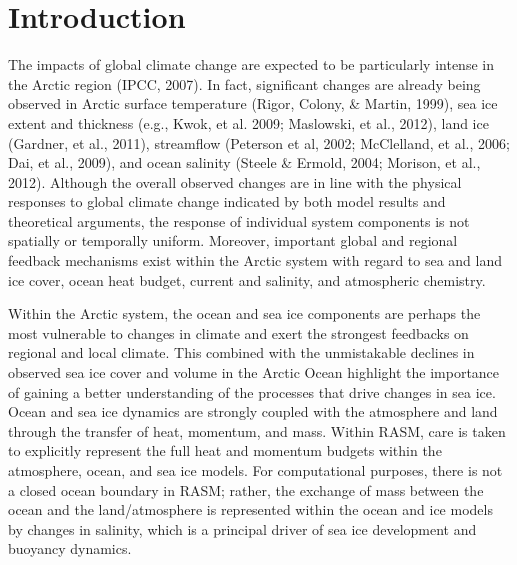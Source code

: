 \section{Introduction}
 
The impacts of global climate change are expected to be particularly intense in the Arctic region (IPCC, 2007).
In fact, significant changes are already being observed in Arctic surface temperature (Rigor, Colony, & Martin, 1999), sea ice extent and thickness (e.g., Kwok, et al. 2009; Maslowski, et al., 2012), land ice (Gardner, et al., 2011), streamflow (Peterson et al, 2002; McClelland, et al., 2006; Dai, et al., 2009), and ocean salinity (Steele & Ermold, 2004; Morison, et al., 2012).
Although the overall observed changes are in line with the physical responses to global climate change indicated by both model results and theoretical arguments, the response of individual system components is not spatially or temporally uniform.
Moreover, important global and regional feedback mechanisms exist within the Arctic system with regard to sea and land ice cover, ocean heat budget, current and salinity, and atmospheric chemistry.

Within the Arctic system, the ocean and sea ice components are perhaps the most vulnerable to changes in climate and exert the strongest feedbacks on regional and local climate.
This combined with the unmistakable declines in observed sea ice cover and volume in the Arctic Ocean highlight the importance of gaining a better understanding of the processes that drive changes in sea ice.
Ocean and sea ice dynamics are strongly coupled with the atmosphere and land through the transfer of heat, momentum, and mass. Within RASM, care is taken to explicitly represent the full heat and momentum budgets within the atmosphere, ocean, and sea ice models.
For computational purposes, there is not a closed ocean boundary in RASM; rather, the exchange of mass between the ocean and the land/atmosphere is represented within the ocean and ice models by changes in salinity, which is a principal driver of sea ice development and buoyancy dynamics. 
  
  
